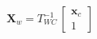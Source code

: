 \begin{equation*}
    \mathbf{X}_w = T_{WC}^{-1}\,
    \begin{bmatrix}
        \mathbf{x}_c \\
        1
    \end{bmatrix}
\end{equation*}
